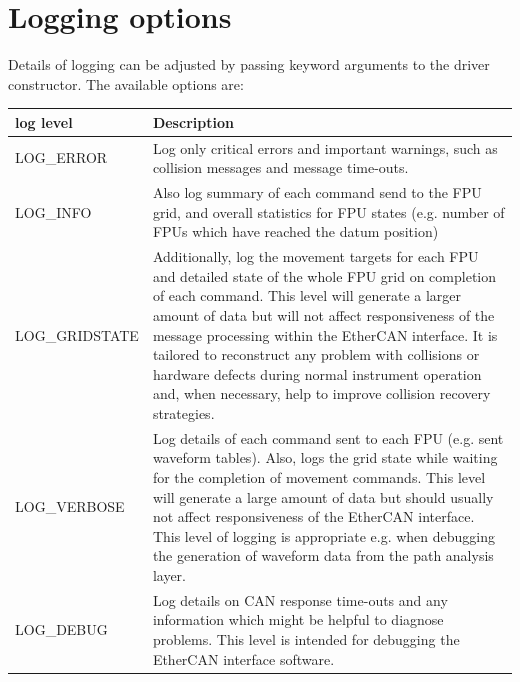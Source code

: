 \documentclass[fontsize=12,a4paper]{scrreprt}
\begin{document}
\section{Logging options}
Details of logging can be adjusted by passing keyword
arguments to the driver constructor. The available options are:

\begin{table}
  \begin{centering}
\begin{tabular}{|l|p{}|}
  \hline
  \textbf{log level} & \textbf{Description} \\
  \hline
    LOG\_ERROR &
    Log only critical errors and important warnings, such as collision
    messages and message time-outs. \\

    \hline
    LOG\_INFO &
    Also log summary of each command send to the FPU grid, and
    overall statistics for FPU states (e.g. number of FPUs which
    have reached the datum position) \\

    \hline
    LOG\_GRIDSTATE &
    Additionally, log the movement targets for each
    FPU and detailed state of the whole FPU grid on completion of each
    command.  This level will generate a larger amount of data but
    will not affect responsiveness of the message processing within
    the EtherCAN interface.  It is tailored to reconstruct any problem with
    collisions or hardware defects during normal instrument operation
    and, when necessary, help to improve collision recovery
    strategies. \\

    \hline
    LOG\_VERBOSE &

    Log details of each command sent to each FPU
    (e.g. sent waveform tables). Also, logs the grid state while
    waiting for the completion of movement commands. This level will
    generate a large amount of data but should usually not affect
    responsiveness of the EtherCAN interface. This level of logging is appropriate
    e.g. when debugging the generation of waveform data from the path
    analysis layer. \\

    \hline
    LOG\_DEBUG &
    Log details on CAN response time-outs and any information which
    might be helpful to diagnose problems. This level is intended
    for debugging the EtherCAN interface software.\\


\end{tabular}
\end{centering}
\end{table}
\end{document}
